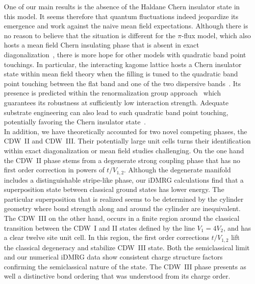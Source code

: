 \documentclass[aps,prx,10pt,twocolumn,floatfix,superscriptaddress,showpacs,numerical,footinbib]{revtex4-1}
\begin{document}
One of our main results is the absence of the Haldane Chern insulator state in this model.
%
It seems therefore that quantum fluctuations indeed jeopardize its emergence and work against
the naive mean field expectations.
%
Although there is no reason to believe that the situation is different for the $\pi$-flux model, which also hosts a
mean field Chern insulating phase that is absent in exact diagonalization~\cite{WF10,JGC13}, 
there is more hope for other models with quadratic band point touchings.
%
In particular, the interacting kagome lattice hosts a Chern insulator state within mean field theory when the filling is tuned to
the quadratic band point touching between the flat band and one of the two dispersive bands~\cite{WRW10}.
%
Its presence is predicted within the renormalization group approach~\cite{SF08,SYF09} which guarantees
its robustness at sufficiently low interaction strength.
%
Adequate substrate engineering can also lead to such quadratic band point touching, potentially favoring the Chern insulator state~\cite{MVB14}.
\\
%
In addition, we have theoretically accounted for two novel competing phases, the CDW~II and CDW~III.
%
Their potentially large unit cells turns their identification within exact diagonalization or mean field studies 
challenging.
%
On the one hand the CDW~II phase stems from a degenerate strong coupling phase that has no first order correction in powers of $t/V_{1,2}$.
%
Although the degenerate manifold includes a distinguishable stripe-like phase, our iDMRG calculations find that a superposition state 
between classical ground states has lower energy.
%
The particular superposition that is realized seems to be determined by the cylinder geometry where bond strength along
and around the cylinder are inequivalent. 
%
The CDW~III on the other hand, occurs in a finite region around the classical transition between
the CDW~I and II states defined by the line $V_{1}=4V_{2}$, and has a clear twelve site unit cell.
%
In this region, the first order corrections $t/V_{1,2}$ lift the classical degeneracy and stabilize CDW~III state.
%
Both the semiclassical limit and our numerical iDMRG data show consistent charge structure factors confirming
the semiclassical nature of the state.
%
The CDW~III phase presents as well a distinctive bond ordering that was understood from its charge order.
\end{document}
